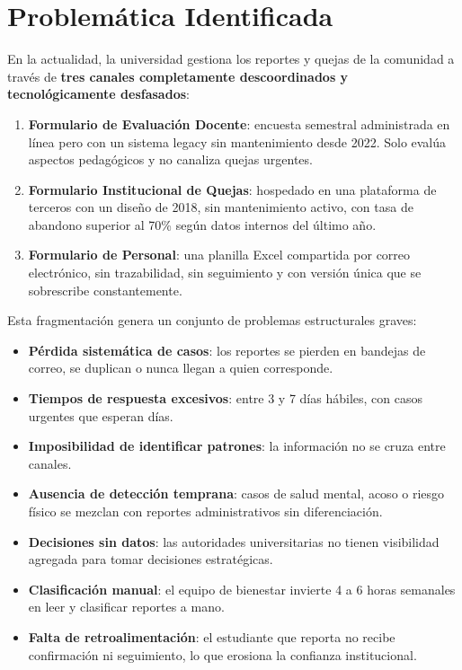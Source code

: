 \documentclass[11pt,a4paper]{article}
\begin{document}
\section{Problem\'atica Identificada}

En la actualidad, la universidad gestiona los reportes y quejas de la comunidad a trav\'es de \textbf{tres canales completamente descoordinados y tecnol\'ogicamente desfasados}:

\begin{enumerate}[leftmargin=*, label=\textbf{\arabic*.}]
    \item \textbf{Formulario de Evaluaci\'on Docente}: encuesta semestral administrada en l\'inea pero con un sistema legacy sin mantenimiento desde 2022. Solo eval\'ua aspectos pedag\'ogicos y no canaliza quejas urgentes.
    
    \item \textbf{Formulario Institucional de Quejas}: hospedado en una plataforma de terceros con un dise\~no de 2018, sin mantenimiento activo, con tasa de abandono superior al 70\% seg\'un datos internos del \'ultimo a\~no.
    
    \item \textbf{Formulario de Personal}: una planilla Excel compartida por correo electr\'onico, sin trazabilidad, sin seguimiento y con versi\'on \'unica que se sobrescribe constantemente.
\end{enumerate}

Esta fragmentaci\'on genera un conjunto de problemas estructurales graves:

\begin{itemize}[leftmargin=*]
    \item \textbf{P\'erdida sistem\'atica de casos}: los reportes se pierden en bandejas de correo, se duplican o nunca llegan a quien corresponde.
    \item \textbf{Tiempos de respuesta excesivos}: entre 3 y 7 d\'ias h\'abiles, con casos urgentes que esperan d\'ias.
    \item \textbf{Imposibilidad de identificar patrones}: la informaci\'on no se cruza entre canales.
    \item \textbf{Ausencia de detecci\'on temprana}: casos de salud mental, acoso o riesgo f\'isico se mezclan con reportes administrativos sin diferenciaci\'on.
    \item \textbf{Decisiones sin datos}: las autoridades universitarias no tienen visibilidad agregada para tomar decisiones estrat\'egicas.
    \item \textbf{Clasificaci\'on manual}: el equipo de bienestar invierte 4 a 6 horas semanales en leer y clasificar reportes a mano.
    \item \textbf{Falta de retroalimentaci\'on}: el estudiante que reporta no recibe confirmaci\'on ni seguimiento, lo que erosiona la confianza institucional.
\end{itemize}
\end{document}
